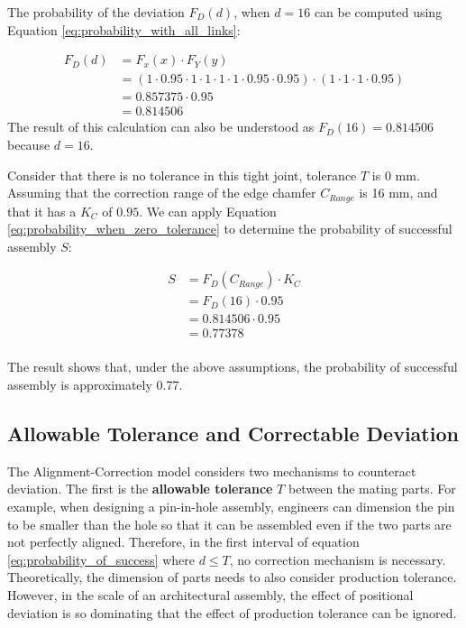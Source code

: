 The probability of the deviation $F_D(d)$, when $d = 16$ can be computed using Equation \ref{eq:probability_with_all_links}:

\begin{align}
    F_D(d) &= F_x(x) \cdot F_Y(y) \nonumber\\
      &= (1 \cdot 0.95 \cdot 1 \cdot 1 \cdot 1 \cdot 1 \cdot 0.95 \cdot 0.95) \cdot (1 \cdot 1 \cdot 1 \cdot 0.95)\nonumber\\
      &= 0.857375 \cdot 0.95\nonumber\\
      &= 0.814506\nonumber
\end{align}
The result of this calculation can also be understood as $F_D(16) = 0.814506$ because $d = 16$.

Consider that there is no tolerance in this tight joint, tolerance $T$ is 0 mm. Assuming that the correction range of the edge chamfer $C_{Range}$ is 16 mm, and that it has a $K_C$ of $0.95$. We can apply Equation \ref{eq:probability_when_zero_tolerance} to determine the probability of successful assembly $S$:

\begin{align}
    S &= F_D(C_{Range}) \cdot K_C \nonumber\\
      &= F_D(16) \cdot 0.95 \nonumber\\
      &=  0.814506 \cdot 0.95 \nonumber\\
      &= 0.77378 \nonumber\\
\end{align}

The result shows that, under the above assumptions, the probability of successful assembly is approximately 0.77. 

\subsection{Allowable Tolerance and Correctable Deviation}

The Alignment-Correction model considers two mechanisms to counteract deviation. The first is the \textbf{allowable tolerance} $T$ between the mating parts. For example, when designing a pin-in-hole assembly, engineers can dimension the pin to be smaller than the hole so that it can be assembled even if the two parts are not perfectly aligned. Therefore, in the first interval of equation \ref{eq:probability_of_success} where $ d \leq T$, no correction mechanism is necessary. Theoretically, the dimension of parts needs to also consider production tolerance. However, in the scale of an architectural assembly, the effect of positional deviation is so dominating that the effect of production tolerance can be ignored.

